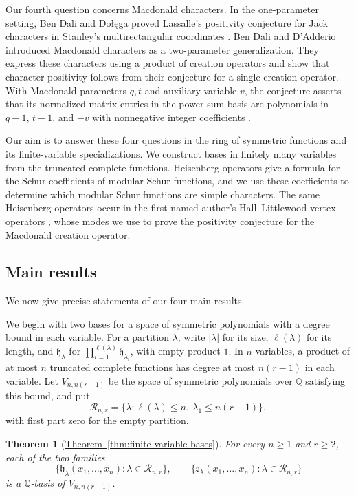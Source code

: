\documentclass[12pt,reqno,a4paper]{amsart}
\numberwithin{equation}{section}
\numberwithin{figure}{section}
\theoremstyle{plain}
\newtheorem{mainthm}{Theorem}
\theoremstyle{definition}
\begin{document}
Our fourth question concerns Macdonald characters.  In the
one-parameter setting, Ben Dali and {\selectfont Do{\l}\k{e}ga} proved
Lassalle's positivity conjecture for Jack characters in Stanley's
multirectangular coordinates \cite{LassalleJack,BenDaliDolega}.
Ben Dali and D'Adderio introduced Macdonald characters as a
two-parameter generalization.  They express these characters using a
product of creation operators and show that character positivity
follows from their conjecture for a single creation operator.  With
Macdonald parameters $q,t$ and auxiliary variable $v$, the conjecture
asserts that its normalized matrix entries in the power-sum basis are
polynomials in $q-1$, $t-1$, and $-v$ with nonnegative integer
coefficients \cite[Definition~1.4, Conjecture~1 and Proposition~4.7]{BD26}.

Our aim is to answer these four questions in the ring of symmetric
functions and its finite-variable specializations.  We construct bases
in finitely many variables from the truncated complete functions.
Heisenberg operators give a formula for the Schur coefficients of
modular Schur functions, and we use these coefficients to determine
which modular Schur functions are simple characters.  The same
Heisenberg operators occur in the first-named author's Hall--Littlewood vertex operators
\cite{JingVertex}, whose modes we use to prove the positivity conjecture
for the Macdonald creation operator.

\subsection{Main results}

We now give precise statements of our four main results.

We begin with two bases for a space of symmetric polynomials with a
degree bound in each variable.
For a partition $\lambda$, write $|\lambda|$ for its size,
$\ell(\lambda)$ for its length, and $\mathfrak h_\lambda$ for
$\prod_{i=1}^{\ell(\lambda)}\mathfrak h_{\lambda_i}$, with empty
product $1$.  In $n$ variables, a product of at most $n$ truncated
complete functions has degree at most $n(r-1)$ in each variable.
Let $V_{n,n(r-1)}$ be the space of symmetric polynomials over
$\mathbb Q$ satisfying this bound, and put
\[
 \mathcal R_{n,r}=\{\lambda:\ell(\lambda)\leq n,\ \lambda_1\leq n(r-1)\},
\]
with first part zero for the empty partition.

\begin{mainthm}[{\hyperref[thm:finite-variable-bases]{Theorem~\ref*{thm:finite-variable-bases}}}]
\label{thm:intro-finite-bases}
For every $n\geq1$ and $r\geq2$, each of the two families
\[
 \{\mathfrak h_\lambda(x_1,\ldots,x_n):\lambda\in\mathcal R_{n,r}\},
 \qquad
 \{\mathfrak s_\lambda(x_1,\ldots,x_n):\lambda\in\mathcal R_{n,r}\}
\]
is a $\mathbb Q$-basis of $V_{n,n(r-1)}$.
\end{mainthm}
\end{document}
